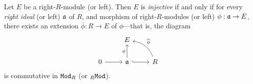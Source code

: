 \begin{theorem}
    \label{thm:baer-criterion}
    Let \(E\) be a right-\(R\)-module (or left). Then \(E\) is \emph{injective} if
    and only if for every \emph{right ideal} (or left) \(\mathfrak{a}\) of \(R\), and
    morphism of right-\(R\)-modules (or left) \(\phi: \mathfrak{a} \to E\), there exists
    an extension \(\overline{\phi}: R \to E\) of \(\phi\)---that is, the diagram
    \[
        \begin{tikzcd}
            &E & \\
            0 \ar[r] &\ideal a \ar[r, hook] \ar[u, "\phi"]
            &R \ar[lu, bend right, "\overline{\phi}"']
        \end{tikzcd}
    \]
    is commutative in \({\texttt{Mod}_{R}}\) (or \({{}_{R}\texttt{Mod}}\)).
\end{theorem}

